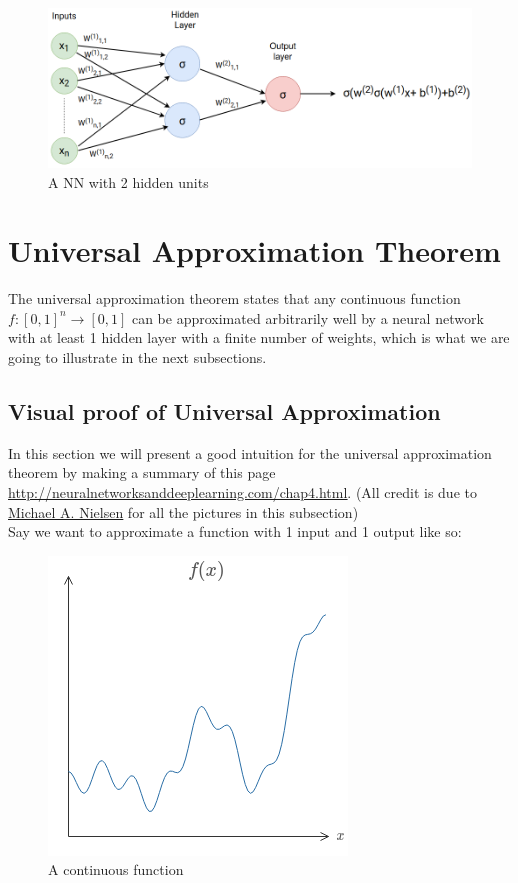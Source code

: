 \documentclass{article}
\begin{document}
\begin{figure}[H]
    \centering
    \includegraphics[width=.8\textwidth]{figures/nn.png}
    \caption{A NN with 2 hidden units}
\end{figure}


\section{Universal Approximation Theorem}

The universal approximation theorem states that any continuous function $f :[0,1]^n \xrightarrow{} [0,1]$
can be approximated arbitrarily well by a neural network with at least 1 hidden layer with a finite number of weights, which is what we are going to illustrate in the next subsections. \par

\subsection{Visual proof of Universal Approximation}
In this section we will present a good intuition for the universal approximation theorem by making a summary of this page \href{http://neuralnetworksanddeeplearning.com/chap4.html}{\underline{http://neuralnetworksanddeeplearning.com/chap4.html}}. (All credit is due to \href{http://neuralnetworksanddeeplearning.com/}{\underline{Michael A. Nielsen}} for all the pictures in this subsection) \\

Say we want to approximate a function with 1 input and 1 output like so:
\begin{figure}[H]
    \centering
    \includegraphics[width=.4\textwidth]{figures/function.png}
    \caption{A continuous function}
\end{figure}
\end{document}
